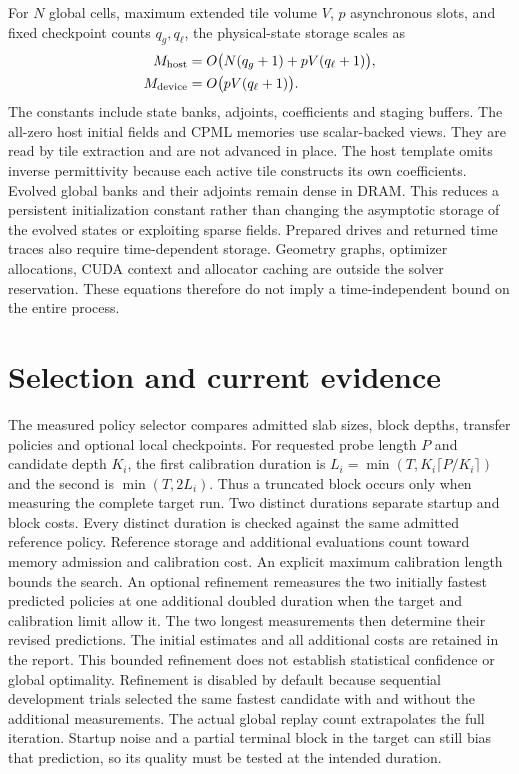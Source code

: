 \documentclass[11pt,a4paper]{article}
\begin{document}
For $N$ global cells, maximum extended tile volume $V$, $p$ asynchronous slots,
and fixed checkpoint counts $q_g,q_\ell$, the physical-state storage scales as
\begin{align}
 M_{\rm host}&=O\bigl(N(q_g+1)+pV(q_\ell+1)\bigr),\\
 M_{\rm device}&=O\bigl(pV(q_\ell+1)\bigr).
\end{align}
The constants include state banks, adjoints, coefficients and staging buffers.
The all-zero host initial fields and CPML memories use scalar-backed views.
They are read by tile extraction and are not advanced in place. The host
template omits inverse permittivity because each active tile constructs its
own coefficients. Evolved global banks and their adjoints remain dense in
DRAM. This reduces a persistent initialization constant rather than changing
the asymptotic storage of the evolved states or exploiting sparse fields.
Prepared drives and returned time traces also require time-dependent storage.
Geometry graphs, optimizer allocations, CUDA context and allocator caching
are outside the solver reservation. These equations therefore do not imply
a time-independent bound on the entire process.

\section{Selection and current evidence}
The measured policy selector compares admitted slab sizes, block depths,
transfer policies and optional local checkpoints. For requested probe length
$P$ and candidate depth $K_i$, the first calibration duration is
$L_i=\min(T,K_i\lceil P/K_i\rceil)$ and the second is
$\min(T,2L_i)$. Thus a truncated block occurs only when measuring the complete
target run. Two distinct durations separate startup and block costs. Every
distinct duration is checked against the same admitted reference policy.
Reference storage and additional evaluations count toward memory admission and
calibration cost. An explicit maximum calibration length bounds the search.
An optional refinement remeasures the two initially fastest predicted policies
at one additional doubled duration when the target and calibration limit allow
it. The two longest measurements then determine their revised predictions.
The initial estimates and all additional costs are retained in the report.
This bounded refinement does not establish statistical confidence or global
optimality.
Refinement is disabled by default because sequential development trials
selected the same fastest candidate with and without the additional measurements.
The actual global replay count extrapolates the full iteration. Startup noise
and a partial terminal block in the target can still bias that prediction,
so its quality must be tested at the intended duration.
\end{document}
